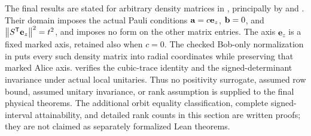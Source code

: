 The final results are stated for arbitrary density matrices in
, principally by
 and
. Their domain imposes the
actual Pauli conditions $\aa=c\mathbf e_z$, $\bb=0$, and
$\norm{S^{\mathsf T}\mathbf e_z}^2=t^2$, and imposes no form on the other
matrix entries. The axis $\mathbf e_z$ is a fixed marked axis, retained also
when $c=0$. The checked Bob-only normalization in
 puts every such density matrix into
radial coordinates while preserving that marked Alice axis.
 verifies the cubic-trace identity and the
signed-determinant invariance under actual local unitaries. Thus no
positivity surrogate, assumed row bound, assumed unitary invariance, or
rank assumption is supplied to the final physical theorems.
The additional orbit equality classification, complete signed-interval
attainability, and detailed rank counts in this section are written proofs;
they are not claimed as separately formalized Lean theorems.
